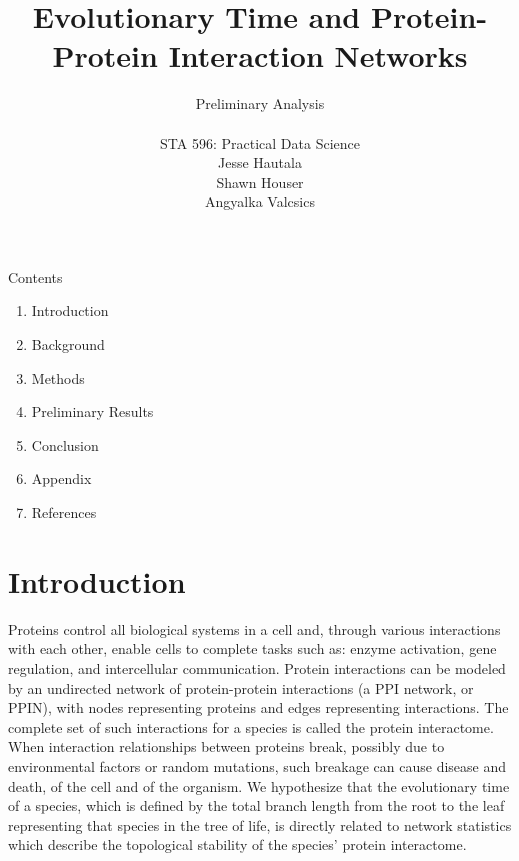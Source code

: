\documentclass[12pt]{article}
\begin{document}
\title{\textbf{Evolutionary Time and Protein-Protein Interaction Networks}}
\author{Preliminary Analysis \\ \\ STA 596: Practical Data Science \\ Jesse Hautala \\ Shawn Houser \\ Angyalka Valcsics }

	\maketitle
\onehalfspacing

\noindent Contents
\begin{enumerate}[label = \Roman{*}.]
\item Introduction
\item Background
\item Methods
\item Preliminary Results
\item Conclusion
\item Appendix
\item References \newpage
\end{enumerate}

\section{Introduction}
Proteins control all biological systems in a cell and, through various interactions with each other, enable cells to complete tasks such as: enzyme activation, gene regulation, and intercellular communication. Protein interactions can be modeled by an undirected network of protein-protein interactions (a PPI network, or PPIN), with nodes representing proteins and edges representing interactions. The complete set of such interactions for a species is called the protein interactome. When interaction relationships between proteins break, possibly due to environmental factors or random mutations, such breakage can cause disease and death, of the cell and of the organism. We hypothesize that the evolutionary time of a species, which is defined by the total branch length from the root to the leaf representing that species in the tree of life, is directly related to network statistics which describe the topological stability of the species’ protein interactome.
\end{document}
